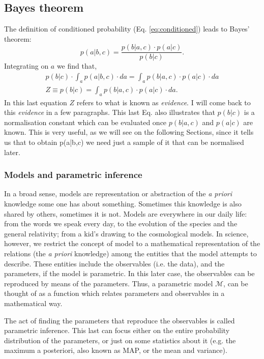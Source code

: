 \subsection{Bayes theorem}
The definition of conditioned probability (Eq. \ref{eq:conditioned}) leads to Bayes' theorem:
\begin{equation}
p(a|b,c) = \frac{p(b|a,c)\cdot p(a|c)}{p(b|c)}.
\end{equation}
Integrating on $a$ we find that,
\begin{align}
\label{eq:evidence}
p(b|c) \cdot \int_a p(a|b,c)\cdot da = \int_a p(b|a,c) \cdot p(a|c) \cdot da \nonumber \\
Z \equiv p(b|c) = \int_a p(b|a,c) \cdot p(a|c) \cdot da.
\end{align}
In this last equation $Z$ refers to what is known as \emph{evidence}. I will come back to this \emph{evidence} in a few paragraphs. This last Eq. also illustrates that $p(b|c)$ is a normalisation constant which can be evaluated once $p(b|a,c)$ and $p(a|c)$ are known. This is very useful, as we will see on the following Sections, since it tells us that to obtain p(a|b,c) we need just a sample of it that can be normalised later.

\subsubsection{Models and parametric inference}
In a broad sense, models are representation or abstraction of the \emph{a priori} knowledge some one has about something. Sometimes this knowledge is also shared by others, sometimes it is not. Models are everywhere in our daily life: from the words we speak every day, to the evolution of the species and the general relativity; from a kid's drawing to the cosmological models. In science, however, we restrict the concept of model to a mathematical representation of the relations (the \emph{a priori} knowledge) among the entities that the model attempts to describe. These entities include the observables (i.e. the data), and the parameters, if the model is parametric. In this later case, the observables can be reproduced by means of the parameters. Thus, a parametric model $\mathcal{M}$, can be thought of as a function which relates parameters and observables in a mathematical way. 

The act of finding the parameters that reproduce the observables is called parametric inference. This last can focus either on the entire probability distribution of the parameters, or just on some statistics about it (e.g. the maximum a posteriori, also known as MAP, or the mean and variance).

